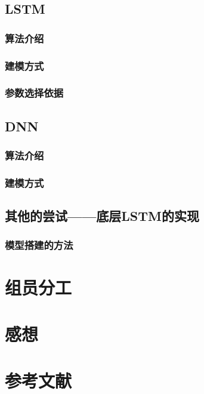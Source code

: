 \documentclass[UTF8]{ctexart}
\begin{document}
\subsection{LSTM}
\subsubsection{算法介绍}
\subsubsection{建模方式}
\subsubsection{参数选择依据}
\subsection{DNN}
\subsubsection{算法介绍}
\subsubsection{建模方式}
\subsection{其他的尝试——底层LSTM的实现}
\subsubsection{模型搭建的方法}
\section{组员分工}
\section{感想}
\section{参考文献}
\end{document}
